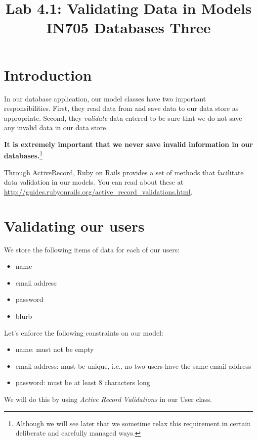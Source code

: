 \documentclass{article}
\begin{document}
\title{Lab 4.1: Validating Data in Models\\ IN705 Databases Three}
\date{}
\maketitle

\section*{Introduction}
In our database application, our model classes have two important responsibilities.  First, they read data from and save data to our data store as appropriate.  Second, they \emph{validate} data entered to be sure that we do not save any invalid data in our data store.  

\textbf{It is extremely important that we never save invalid information in our databases.}\footnote{Although we will see later that we sometime relax this requirement in certain deliberate and carefully managed ways.}

Through ActiveRecord, Ruby on Rails provides a set of methods that facilitate data validation in our models.  You can read about these at \url{http://guides.rubyonrails.org/active\_record\_validations.html}.

\section{Validating our users}
We store the following items of data for each of our users:

\begin{itemize}
 \item name
 \item email address
 \item password
 \item blurb
\end{itemize}

Let's enforce the following constraints on our model:
\begin{itemize}
 \item name: must not be empty
 \item email address: must be unique, i.e., no two users have the same email address
 \item password: must be at least 8 characters long
\end{itemize}

We will do this by using \emph{Active Record Validations} in our User class.
\end{document}
